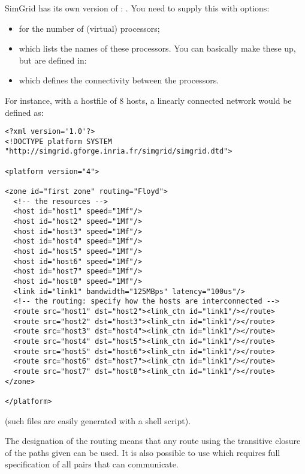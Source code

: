 SimGrid has its own version of : . You
need to supply this with options:
\begin{itemize}
\item {} for the number of (virtual) processors;
\item {} which lists the names of these
  processors. You can basically make these up, but are defined in:
\item {} which defines the connectivity between
  the processors.
\end{itemize}
For instance, with a hostfile of 8 hosts, a linearly connected network
would be defined as:
\begin{verbatim}
<?xml version='1.0'?>
<!DOCTYPE platform SYSTEM "http://simgrid.gforge.inria.fr/simgrid/simgrid.dtd">

<platform version="4">

<zone id="first zone" routing="Floyd">
  <!-- the resources -->
  <host id="host1" speed="1Mf"/>
  <host id="host2" speed="1Mf"/>
  <host id="host3" speed="1Mf"/>
  <host id="host4" speed="1Mf"/>
  <host id="host5" speed="1Mf"/>
  <host id="host6" speed="1Mf"/>
  <host id="host7" speed="1Mf"/>
  <host id="host8" speed="1Mf"/>
  <link id="link1" bandwidth="125MBps" latency="100us"/>
  <!-- the routing: specify how the hosts are interconnected -->
  <route src="host1" dst="host2"><link_ctn id="link1"/></route>
  <route src="host2" dst="host3"><link_ctn id="link1"/></route>
  <route src="host3" dst="host4"><link_ctn id="link1"/></route>
  <route src="host4" dst="host5"><link_ctn id="link1"/></route>
  <route src="host5" dst="host6"><link_ctn id="link1"/></route>
  <route src="host6" dst="host7"><link_ctn id="link1"/></route>
  <route src="host7" dst="host8"><link_ctn id="link1"/></route>
</zone>

</platform>
\end{verbatim}
(such files are easily generated with a shell script).

The  designation of the routing means that any route using
the transitive closure of the paths given can be used.
It is also possible to use  which requires full
specification of all pairs that can communicate.


